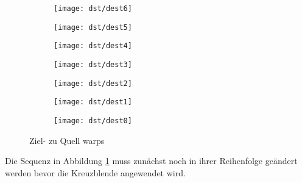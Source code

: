 \begin{figure}[htbp]
	\centering

	    	
	\begin{subfigure}[b]{0.19\textwidth}
		\centering
		\texttt{[image: dst/dest6]} %
		\caption{}
	\end{subfigure}
		\begin{subfigure}[b]{0.19\textwidth}
		\centering
		\texttt{[image: dst/dest5]} %
		\caption{}
	\end{subfigure}
		\begin{subfigure}[b]{0.19\textwidth}
		\centering
		\texttt{[image: dst/dest4]} %
		\caption{}
	\end{subfigure}
		\begin{subfigure}[b]{0.19\textwidth}
		\centering
		\texttt{[image: dst/dest3]} %
		\caption{}
	\end{subfigure}
		\begin{subfigure}[b]{0.19\textwidth}
		\centering
		\texttt{[image: dst/dest2]} %
		\caption{}
	\end{subfigure}
		\begin{subfigure}[b]{0.19\textwidth}
		\centering
		\texttt{[image: dst/dest1]} %
		\caption{}
	\end{subfigure}
		\begin{subfigure}[b]{0.19\textwidth}
		\centering
		\texttt{[image: dst/dest0]} %
		\caption{}
	\end{subfigure}
	
		    
	\caption{Ziel- zu Quell warps}
	\label{fig:destinations}
\end{figure}
Die Sequenz in Abbildung \ref{fig:destinations} muss zunächst noch
in ihrer Reihenfolge geändert werden bevor
die Kreuzblende angewendet wird.

